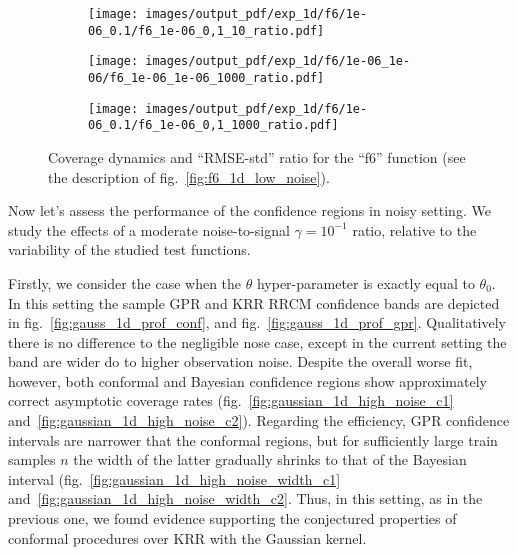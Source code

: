 \documentclass[a4paper,14pt]{extarticle}
\begin{document}
\begin{figure}
  \begin{subfigure}[b]{0.25\linewidth}
    \texttt{[image: images/output\_pdf/exp\_1d/f6/1e-06\_0.1/f6\_1e-06\_0,1\_10\_ratio.pdf]}
    \caption{} \label{fig:f6_1d_low_noise_arb_c2}
  \end{subfigure}%
  \begin{subfigure}[b]{0.25\linewidth}
    \texttt{[image: images/output\_pdf/exp\_1d/f6/1e-06\_1e-06/f6\_1e-06\_1e-06\_1000\_ratio.pdf]}
    \caption{} \label{fig:f6_1d_low_noise_arb_c3}
  \end{subfigure}%
  \begin{subfigure}[b]{0.25\linewidth}
    \texttt{[image: images/output\_pdf/exp\_1d/f6/1e-06\_0.1/f6\_1e-06\_0,1\_1000\_ratio.pdf]}
    \caption{} \label{fig:f6_1d_low_noise_arb_c4}
  \end{subfigure}%
  \caption{Coverage dynamics and ``RMSE-std'' ratio for the ``f6'' function (see
  the description of fig.~\ref{fig:f6_1d_low_noise}).}
  \label{fig:f6_1d_low_noise_arb}
\end{figure}

Now let's assess the performance of the confidence regions in noisy setting. We
study the effects of a moderate noise-to-signal $\gamma=10^{-1}$ ratio, relative
to the variability of the studied test functions.

Firstly, we consider the case when the $\theta$ hyper-parameter is exactly equal
to $\theta_0$. In this setting the sample GPR and KRR RRCM confidence bands are
depicted in fig.~\ref{fig:gauss_1d_prof_conf}, and fig.~\ref{fig:gauss_1d_prof_gpr}.
Qualitatively there is no difference to the negligible nose case, except in the current
setting the band are wider do to higher observation noise. Despite the overall worse
fit, however, both conformal and Bayesian confidence regions show approximately correct
asymptotic coverage rates (fig.~\ref{fig:gaussian_1d_high_noise_c1} and~\ref{fig:gaussian_1d_high_noise_c2}).
Regarding the efficiency, GPR confidence intervals are narrower that the conformal
regions, but for sufficiently large train samples $n$ the width of the latter gradually
shrinks to that of the Bayesian interval (fig.~\ref{fig:gaussian_1d_high_noise_width_c1}
and~\ref{fig:gaussian_1d_high_noise_width_c2}. Thus, in this setting, as in the
previous one, we found evidence supporting the conjectured properties of conformal
procedures over KRR with the Gaussian kernel.
\end{document}
